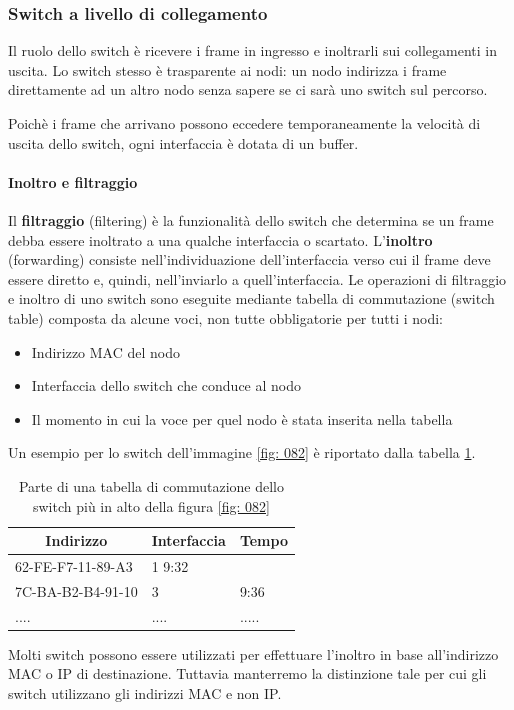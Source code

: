 \documentclass[11pt,a4paper]{article}
\begin{document}
\subsubsection{Switch a livello di collegamento}
Il ruolo dello switch è ricevere i frame in ingresso e inoltrarli sui collegamenti in uscita. Lo switch stesso è trasparente ai nodi: un nodo indirizza i frame direttamente ad un altro nodo senza sapere se ci sarà uno switch sul percorso.

Poichè i frame che arrivano possono eccedere temporaneamente la velocità di uscita dello switch, ogni interfaccia è dotata di un buffer.

\paragraph{Inoltro e filtraggio}
Il \textbf{filtraggio} (filtering) è la funzionalità dello switch che determina se un frame debba essere inoltrato a una qualche interfaccia o scartato. L'\textbf{inoltro} (forwarding) consiste nell'individuazione dell'interfaccia verso cui il frame deve essere diretto e, quindi, nell'inviarlo a quell'interfaccia. Le operazioni di filtraggio e inoltro di uno switch sono eseguite mediante tabella di commutazione (switch table) composta da alcune voci, non tutte obbligatorie per tutti i nodi:
\begin{itemize}
	\item Indirizzo MAC del nodo
	\item Interfaccia dello switch che conduce al nodo
	\item Il momento in cui la voce per quel nodo è stata inserita nella tabella
\end{itemize}
Un esempio per lo switch dell'immagine \ref{fig: 082} è riportato dalla tabella \ref{tab: 003}.
\begin{table}[]
	\begin{tabular}{|l|l|l|}
		\hline
		\multicolumn{1}{|c|}{\textbf{Indirizzo}} & \multicolumn{1}{c|}{\textbf{Interfaccia}} & \multicolumn{1}{c|}{\textbf{Tempo}} \\ \hline
		62-FE-F7-11-89-A3 				& 1				  9:32				\\ \hline
		7C-BA-B2-B4-91-10				& 3				&9:36				\\ \hline
		....							& ....			& .....				\\ \hline
	\end{tabular}
	\caption{Parte di una tabella di commutazione dello switch più in alto della figura \ref{fig: 082}}
	\label{tab: 003}
\end{table}
Molti switch possono essere utilizzati per effettuare l'inoltro in base all'indirizzo MAC o IP di destinazione. Tuttavia manterremo la distinzione tale per cui gli switch utilizzano gli indirizzi MAC e non IP.
\end{document}
